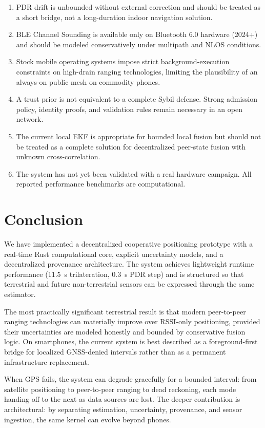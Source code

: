 \documentclass[12pt,a4paper]{article}
\begin{document}
\begin{enumerate}
    \item PDR drift is unbounded without external correction and should be treated as a short bridge, not a long-duration indoor navigation solution.
    \item BLE Channel Sounding is available only on Bluetooth 6.0 hardware (2024+) and should be modeled conservatively under multipath and NLOS conditions.
    \item Stock mobile operating systems impose strict background-execution constraints on high-drain ranging technologies, limiting the plausibility of an always-on public mesh on commodity phones.
    \item A trust prior is not equivalent to a complete Sybil defense. Strong admission policy, identity proofs, and validation rules remain necessary in an open network.
    \item The current local EKF is appropriate for bounded local fusion but should not be treated as a complete solution for decentralized peer-state fusion with unknown cross-correlation.
    \item The system has not yet been validated with a real hardware campaign. All reported performance benchmarks are computational.
\end{enumerate}

\section{Conclusion}

We have implemented a decentralized cooperative positioning prototype with a real-time Rust computational core, explicit uncertainty models, and a decentralized provenance architecture. The system achieves lightweight runtime performance (11.5~\textmu s trilateration, 0.3~\textmu s PDR step) and is structured so that terrestrial and future non-terrestrial sensors can be expressed through the same estimator.

The most practically significant terrestrial result is that modern peer-to-peer ranging technologies can materially improve over RSSI-only positioning, provided their uncertainties are modeled honestly and bounded by conservative fusion logic. On smartphones, the current system is best described as a foreground-first bridge for localized GNSS-denied intervals rather than as a permanent infrastructure replacement.

When GPS fails, the system can degrade gracefully for a bounded interval: from satellite positioning to peer-to-peer ranging to dead reckoning, each mode handing off to the next as data sources are lost. The deeper contribution is architectural: by separating estimation, uncertainty, provenance, and sensor ingestion, the same kernel can evolve beyond phones.
\end{document}
